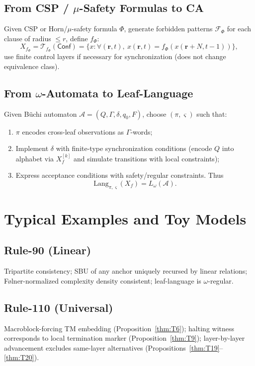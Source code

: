 \documentclass[11pt]{article}
\theoremstyle{definition}
\theoremstyle{remark}
\begin{document}
\subsection{From CSP / \(\mu\)-Safety Formulas to CA}
Given CSP or Horn/\( \mu \)-safety formula \( \Phi \), generate forbidden patterns \( \mathcal{F}_\Phi \) for each clause of radius \( \leq r \), define \( f_\Phi \):
\[
X_{f_\Phi} = \mathcal{T}_{f_\Phi}(\mathsf{Conf}) = \{x : \forall (\mathbf{r}, t), \ x(\mathbf{r}, t) = f_\Phi(x(\mathbf{r} + N, t-1))\},
\]
use finite control layers if necessary for synchronization (does not change equivalence class).

\subsection{From \(\omega\)-Automata to Leaf-Language}
Given Büchi automaton \( \mathcal{A} = (Q, \Gamma, \delta, q_0, F) \), choose \( (\pi, \varsigma) \) such that:

\begin{enumerate}
\item \( \pi \) encodes cross-leaf observations as \( \Gamma \)-words;
\item Implement \( \delta \) with finite-type synchronization conditions (encode \( Q \) into alphabet via \( X_f^{[k]} \) and simulate transitions with local constraints);
\item Express acceptance conditions with safety/regular constraints. Thus
\[
\mathrm{Lang}_{\pi, \varsigma}(X_f) = L_\omega(\mathcal{A}).
\]
\end{enumerate}

\section{Typical Examples and Toy Models}

\subsection{Rule-90 (Linear)}
Tripartite consistency; SBU of any anchor uniquely recursed by linear relations; Følner-normalized complexity density consistent; leaf-language is \( \omega \)-regular.

\subsection{Rule-110 (Universal)}
Macroblock-forcing TM embedding (Proposition~\ref{thm:T6}); halting witness corresponds to local termination marker (Proposition~\ref{thm:T9}); layer-by-layer advancement excludes same-layer alternatives (Propositions~\ref{thm:T19}--\ref{thm:T20}).
\end{document}
